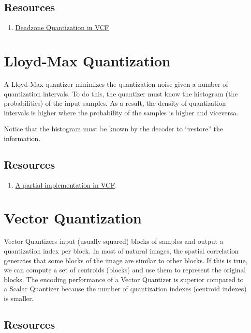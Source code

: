 \subsection*{Resources}
\begin{enumerate}
\item
  \href{https://github.com/Sistemas-Multimedia/VCF/blob/main/src/deadzone.py}{Deadzone
    Quantization in VCF}.
\end{enumerate}

\section{Lloyd-Max Quantization}

A Lloyd-Max quantizer minimizes the quantization noise given a number
of quantization intervals. To do this, the quantizer must know the
histogram (the probabilities) of the input samples. As a result, the
density of quantization intervals is higher where the probability of
the samples is higher and viceversa.

Notice that the histogram must be known by the decoder to ``restore''
the information.

\subsection*{Resources}

\begin{enumerate}
\item
  \href{https://github.com/Sistemas-Multimedia/VCF/blob/main/src/LloydMax.py}{A
    partial implementation in VCF}.
\end{enumerate}

\section{Vector Quantization~\cite{vruiz__vector_quantization}}

Vector Quantizers input (usually squared) blocks of samples and output
a quantization index per block. In most of natural images, the spatial
correlation generates that some blocks of the image are similar to
other blocks. If this is true, we can compute a set of centroids
(blocks) and use them to represent the original blocks. The encoding
performance of a Vector Quantizer is superior compared to a Scalar
Quantizer because the number of quantization indexes (centroid
indexes) is smaller.

\subsection*{Resources}

